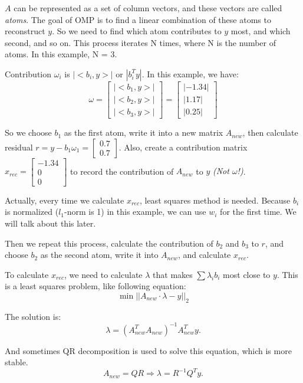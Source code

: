 \documentclass[10pt,a4paper,oneside,numbers=noenddot]{scrbook}
\theoremstyle{ctplain}
\theoremstyle{ctresult}
\begin{document}
$A$ can be represented as a set of column vectors, and these vectors are called
\emph{atoms}. The goal of OMP is to find a linear combination of these atoms to
reconstruct $y$. So we need to find which atom contributes to $y$ most, and which
second, and so on. This process iterates N times, where N is the number of atoms.
In this example, N = 3.

Contribution $\omega_i$ is $|<b_i, y>|$ or $|b_i^Ty|$. In this example, we have:
\[
  \omega = \begin{bmatrix}
    |<b_1, y>| \\
    |<b_2, y>| \\
    |<b_3, y>|
  \end{bmatrix}
  = \begin{bmatrix}
    |-1.34| \\
    |1.17| \\
    |0.25|
  \end{bmatrix}
\]

So we choose $b_1$ as the first atom, write it into a new matrix $A_{new}$, then
calculate residual $r = y - b_1\omega_1 = \begin{bmatrix} 0.7 \\ 0.7 \end{bmatrix}$.
Also, create a contribution matrix $x_{rec} = \begin{bmatrix} -1.34 \\ 0 \\ 0
\end{bmatrix}$ to record the contribution of $A_{new}$ to $y$ \emph{(Not $\omega$!)}.

Actually, every time we calculate $x_{rec}$, least squares method is needed.
Because $b_i$ is normalized ($l_1$-norm is 1) in this example, we can use $w_i$ for
the first time. We will talk about this later.

Then we repeat this process, calculate the contribution of $b_2$ and $b_3$ to $r$,
and choose $b_2$ as the second atom, write it into $A_{new}$, and calculate $x_{rec}$.

To calculate $x_{rec}$, we need to calculate $\lambda$ that makes $\sum \lambda_i b_i$
most close to $y$. This is a least squares problem, like following equation:
\[
  \min ||A_{new} \cdot \lambda - y||_2
\]

The solution is:
\[
  \lambda = (A_{new}^TA_{new})^{-1}A_{new}^Ty.
\]

And sometimes QR decomposition is used to solve this equation, which is more stable.
\[
  A_{new} = QR \Rightarrow \lambda = R^{-1}Q^Ty.
\]
\end{document}
